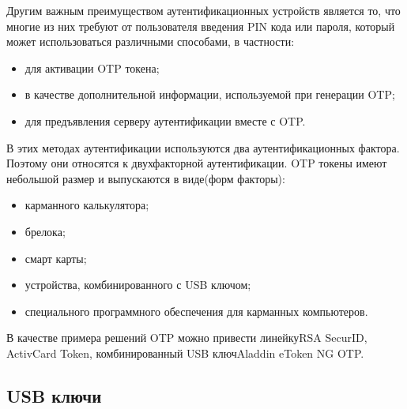 Другим важным преимуществом аутентификационных устройств является то, что многие
из них требуют от пользователя введения PIN кода или пароля, который может
использоваться различными способами, в частности:
\begin{itemize}
  \item для активации OTP токена;
  \item в качестве дополнительной информации, используемой
при генерации OTP;
  \item для предъявления серверу аутентификации вместе с OTP.
\end{itemize}

В этих методах аутентификации используются два аутентификационных фактора.
Поэтому они относятся к двухфакторной аутентификации. OTP токены имеют небольшой
размер и выпускаются в виде(форм факторы):
\begin{itemize}
  \item карманного калькулятора;
  \item брелока;
  \item смарт карты;
  \item устройства,
комбинированного с USB ключом;
  \item специального программного обеспечения для
карманных компьютеров.
\end{itemize}

В качестве примера решений OTP можно привести линейкуRSA
SecurID, ActivCard Token, комбинированный USB ключAladdin eToken NG OTP.
~\cite{auth_n_aut}

\subsection{USB ключи}

